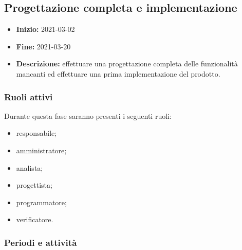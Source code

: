 

\subsection{Progettazione completa e implementazione} \label{_pianificazioneProgettazioneCompletaImplementazione}
\begin{itemize}
    \item []\textbf{Inizio:} 2021-03-02
    \item []\textbf{Fine:} 2021-03-20
    \item []\textbf{Descrizione:} effettuare una progettazione completa delle funzionalità mancanti ed effettuare una prima implementazione del prodotto.
\end{itemize}

\subsubsection{Ruoli attivi}
Durante questa fase saranno presenti i seguenti ruoli:
\begin{itemize}
    \item responsabile;
    \item amministratore;
    \item analista;
    \item progettista;
    \item programmatore;
    \item verificatore.
\end{itemize}

\subsubsection{Periodi e attività}

